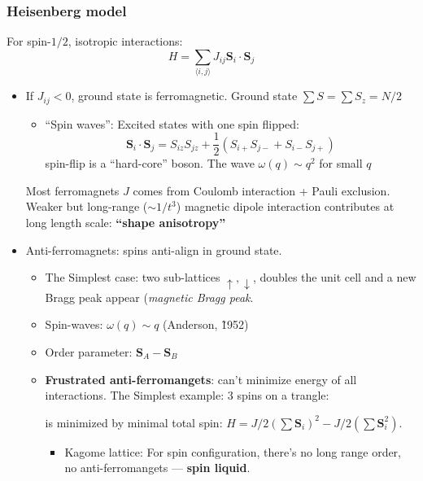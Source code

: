 \documentclass[11pt,letterpaper]{article}
\numberwithin{equation}{section} %
\renewcommand*{\vec}[1]{\bm{#1}}
\newcommand{\spind}{\ensuremath{\downarrow}}
\newcommand{\spinu}{\ensuremath{\uparrow}}
\begin{document}
\subsubsection{Heisenberg model}
\label{ssub:Heisenberg_model}
For spin-$1/2$, isotropic interactions: 
\begin{equation}
  H = \sum_{\langle i,j\rangle}J_{ij}\vec S_i\cdot\vec S_j
\end{equation}
\begin{itemize}
  \item If $J_{ij}<0$, ground state is ferromagnetic. Ground state $\sum S =
	  \sum S_z = N/2$
	\begin{itemize}
	  \item ``Spin waves'': Excited states with one spin flipped: 
		  \begin{equation}
			  \vec S_i\cdot\vec S_j = S_{iz}S_{jz} + \frac 12 \left( 
			  S_{i+}S_{j-}+S_{i-}S_{j+}\right)
		  \end{equation}
		  spin-flip is a ``hard-core'' boson. The wave $\omega(q)\sim q^2$
		  for small $q$
	\end{itemize}
	Most ferromagnets $J$ comes from Coulomb interaction + Pauli exclusion.
	Weaker but long-range ($\sim 1/t^3$) magnetic dipole interaction contributes
	at long length scale: \textbf{``shape anisotropy''} 
  \item Anti-ferromagnets: spins anti-align in ground state. 
	  \begin{itemize}
	    \item The Simplest case: two sub-lattices $\spinu, \spind$, doubles the
			unit cell and a new Bragg peak appear (\emph{magnetic Bragg peak}. 
		\item Spin-waves: $\omega(q)\sim q$ (Anderson, \~ 1952)
		\item Order parameter: $\vec S_A - \vec S_B$
		\item \textbf{Frustrated anti-ferromangets}: can't minimize energy of
			all interactions.  The Simplest example: 3 spins on a trangle: 
			\begin{center}
			\end{center}
			is minimized by minimal total spin: $H=J/2 (\sum \vec S_i)^2 -
		J/2 (\sum \vec S_i^2)$. 
		\begin{itemize}
		  \item Kagome lattice: For spin configuration, there's no long range
			  order, no anti-ferromangets --- \textbf{spin liquid}.
		\end{itemize}
	\end{itemize}
\end{itemize}
\end{document}

